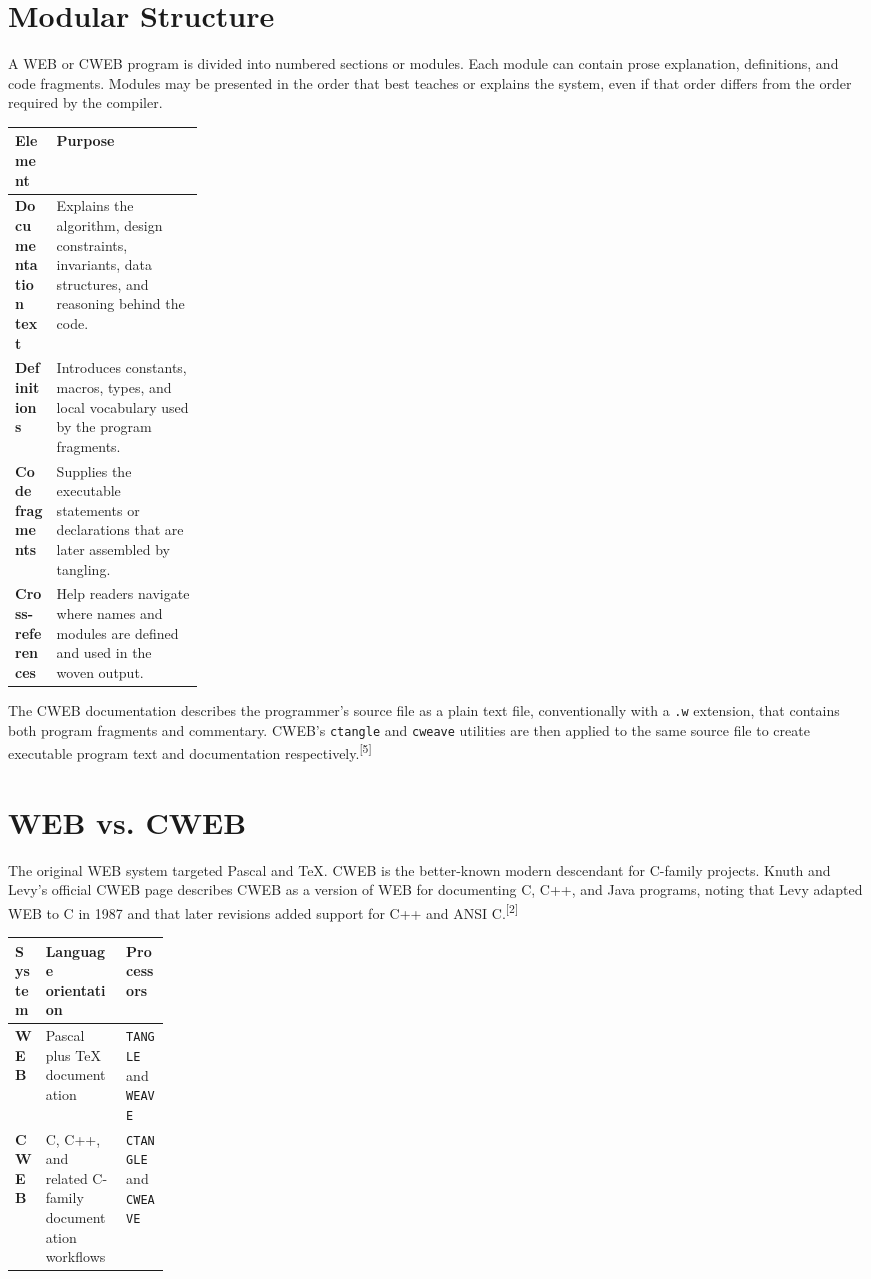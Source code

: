 \documentclass[11pt]{article}
\newcommand{\source}[1]{\textsuperscript{[#1]}}
\begin{document}
\section{Modular Structure}

A WEB or CWEB program is divided into numbered sections or modules. Each module can contain prose explanation, definitions, and code fragments. Modules may be presented in the order that best teaches or explains the system, even if that order differs from the order required by the compiler.

\begin{center}
\begin{tabularx}{0.95\linewidth}{>{\bfseries}p{0.22\linewidth} X}
\toprule
Element & Purpose \\
\midrule
Documentation text & Explains the algorithm, design constraints, invariants, data structures, and reasoning behind the code. \\
Definitions & Introduces constants, macros, types, and local vocabulary used by the program fragments. \\
Code fragments & Supplies the executable statements or declarations that are later assembled by tangling. \\
Cross-references & Help readers navigate where names and modules are defined and used in the woven output. \\
\bottomrule
\end{tabularx}
\end{center}

The CWEB documentation describes the programmer's source file as a plain text file, conventionally with a \texttt{.w} extension, that contains both program fragments and commentary. CWEB's \texttt{ctangle} and \texttt{cweave} utilities are then applied to the same source file to create executable program text and documentation respectively.\source{5}

\section{WEB vs. CWEB}

The original WEB system targeted Pascal and TeX. CWEB is the better-known modern descendant for C-family projects. Knuth and Levy's official CWEB page describes CWEB as a version of WEB for documenting C, C++, and Java programs, noting that Levy adapted WEB to C in 1987 and that later revisions added support for C++ and ANSI C.\source{2}

\begin{center}
\begin{tabularx}{0.95\linewidth}{>{\bfseries}p{0.18\linewidth} X X}
\toprule
System & Language orientation & Processors \\
\midrule
WEB & Pascal plus TeX documentation & \texttt{TANGLE} and \texttt{WEAVE} \\
CWEB & C, C++, and related C-family documentation workflows & \texttt{CTANGLE} and \texttt{CWEAVE} \\
\bottomrule
\end{tabularx}
\end{center}
\end{document}
